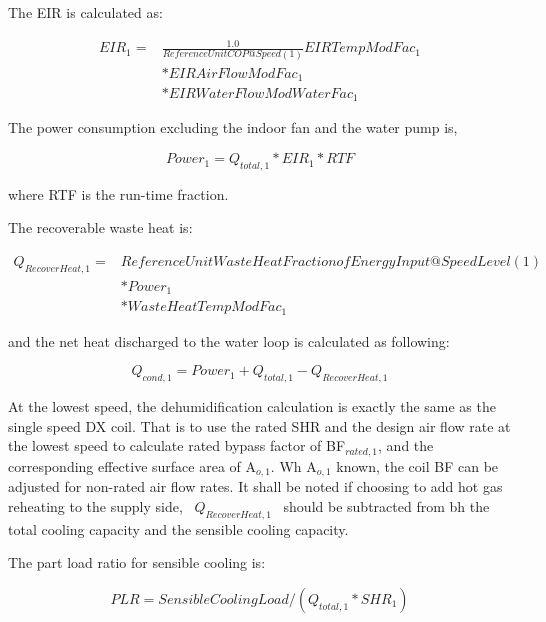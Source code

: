The EIR is calculated as:

\begin{equation}
  \begin{array}{rl}
    EIR_1 =& \frac{1.0}{ReferenceUnitCOP@Speed(1)} EIRTempModFac_1 \\
          &* EIRAirFlowModFac_1 \\
          &* EIRWaterFlowModWaterFac_1 
  \end{array}
\end{equation}

The power consumption excluding the indoor fan and the water pump is,

\begin{equation}
Powe{r_1} = {Q_{total,1}}*EI{R_1}*RTF
\end{equation}

where RTF is the run-time fraction.

The recoverable waste heat is:

\begin{equation}
  \begin{array}{rl}
    Q_{RecoverHeat,1} =& ReferenceUnitWasteHeatFractionofEnergyInput@SpeedLevel\left( 1 \right) \\
                      &* Power_1 \\
                      &* WasteHeatTempModFac_1
  \end{array}
\end{equation}

and the net heat discharged to the water loop is calculated as following:

\begin{equation}
{Q_{cond,1}} = Powe{r_1} + {Q_{total,1}} - {Q_{RecoverHeat,1}}
\end{equation}

At the lowest speed, the dehumidification calculation is exactly the same as the single speed DX coil. That is to use the rated SHR and the design air flow rate at the lowest speed to calculate rated bypass factor of BF\(_{rated,1}\), and the corresponding effective surface area of A\(_{o,1}\). Wh A\(_{o,1}\) known, the coil BF can be adjusted for non-rated air flow rates. It shall be noted if choosing to add hot gas reheating to the supply side,~ \({Q_{RecoverHeat,1}}\) ~should be subtracted from bh the total cooling capacity and the sensible cooling capacity.

The part load ratio for sensible cooling is:

\begin{equation}
PLR = SensibleCoolingLoad/({Q_{total,1}}*SH{R_1})
\end{equation}


